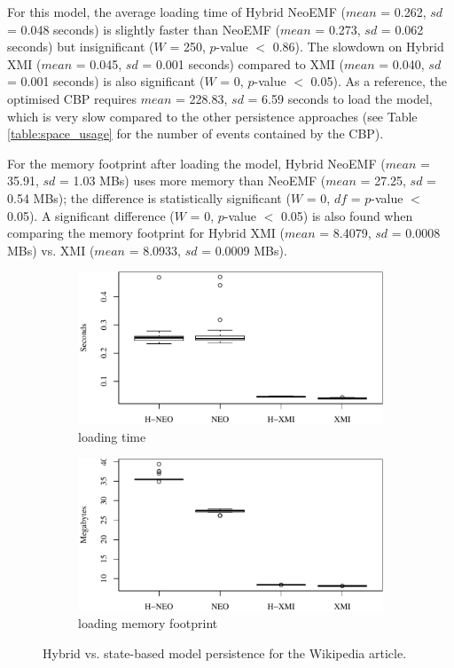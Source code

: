 \documentclass{llncs}
\begin{document}
For this model, the average loading time of Hybrid NeoEMF ($mean$ = 0.262, $sd$ = 0.048 seconds) is slightly faster than NeoEMF ($mean$ = 0.273, $sd$ = 0.062 seconds) but insignificant ($W$ = 250, $p$-value $<$ 0.86). The slowdown on Hybrid XMI ($mean$ = 0.045, $sd$ = 0.001 seconds) compared to XMI ($mean$ = 0.040, $sd$ = 0.001 seconds) is also significant ($W$ = 0, $p$-value $<$ 0.05). As a reference, the optimised CBP \cite{yohannis2018towards} requires $mean$ = 228.83, $sd$ = 6.59 seconds to load the model, which is very slow compared to the other persistence approaches (see Table \ref{table:space_usage} for the number of events contained by the CBP). 

For the memory footprint after loading the model, Hybrid NeoEMF ($mean$ = 35.91, $sd$ = 1.03 MBs) uses more memory than NeoEMF ($mean$ = 27.25, $sd$ = 0.54 MBs); the difference is statistically significant ($W$ = 0, $df$ = $p$-value $<$ 0.05). A significant difference ($W$ = 0, $p$-value $<$ 0.05) is also found when comparing the memory footprint for Hybrid XMI ($mean$ = 8.4079, $sd$ = 0.0008 MBs) vs. XMI ($mean$ = 8.0933, $sd$ = 0.0009 MBs). 

\begin{figure}[ht]
    \begin{subfigure}{0.49\linewidth}
        \includegraphics[width=\linewidth]{images/load_time_wikipedia}
        \caption{loading time}
        \label{fig:load_time_wikipedia}
    \end{subfigure}
    \begin{subfigure}{0.49\linewidth}
        \includegraphics[width=\linewidth]{images/load_memory_wikipedia}
        \caption{loading memory footprint}
        \label{fig:load_memory_wikipedia}
    \end{subfigure}
\caption{Hybrid vs. state-based model persistence for the Wikipedia article.}
\end{figure}
\end{document}
